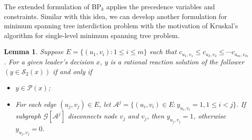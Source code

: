 \documentclass[11pt]{article}
\newtheorem{lemma}{Lemma}
\newcommand{\G}{\mathcal{G}}
\newcommand{\Pp}{\mathcal{P}}
\newcommand{\Ss}{\mathcal{S}}
\newcommand{\Aa}{\mathcal{A}}
\begin{document}
The extended formulation of BP$_k$ applies the precedence variables and constraints. Similar with this idea, we can develop another formulation for minimum spanning tree interdiction problem with the motivation of  Kruskal's algorithm for single-level minimum spanning tree problem.
\begin{lemma} \label{thm:mst_lemma}
	Suppose $E = \{(u_1, v_i): 1\leq i \leq m \}$ such that $c_{u_1,v_1} \leq c_{u_2,v_2} \leq \cdots c_{u_m,v_m}$. For a given leader's decision $x$, $y$ is a rational reaction solution of the follower $(y \in \Ss_2(x))$ if and only if
	\begin{itemize}
		\item[\emph{(i)}] $y \in \Pp(x)$;
		\item[\emph{(ii)}] For each edge $(u_j, v_j) \in E$, let $\Aa^j = \{(u_i, v_i)\in E: y_{u_i, v_i}=1, 1\leq i< j\}$.  If subgraph $\G[\Aa^j]$ disconnects node $v_j$ and $v_j$, then $y_{u_j,v_j} = 1$, otherwise $y_{u_j, v_j} = 0$.  
	\end{itemize}
\end{lemma}
\end{document}
